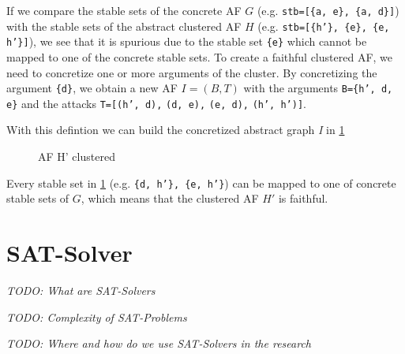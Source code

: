 If we compare the stable sets of the concrete AF $G$ (e.g. \texttt{stb=[\{a, e\}, \{a, d\}]}) with the stable sets of the abstract clustered AF $H$ (e.g. \texttt{stb=[\{h'\}, \{e\}, \{e, h'\}]}), we see that it is spurious due to the stable set \texttt{\{e\}} which cannot be mapped to one of the concrete stable sets. To create a faithful clustered AF, we need to concretize one or more arguments of the cluster. By concretizing the argument \texttt{\{d\}}, we obtain a new AF $I=(B, T)$ with the arguments \texttt{B=\{h', d, e\}} and the attacks \texttt{T=[(h', d),}
\texttt{(d, e),}
\texttt{(e, d),}
\texttt{(h', h')]}. 

With this defintion we can build the concretized abstract graph \textit{I} in \ref{af:backgroundClusterExample3}


\begin{figure}[h]
    \centering
    \caption{\ac{AF} H' clustered}
    \label{af:backgroundClusterExample3}
\end{figure}

Every stable set in \ref{af:backgroundClusterExample3} (e.g. \texttt{\{d, h'\}, \{e, h'\}}) can be mapped to one of concrete stable sets of $G$, which means that the clustered AF $H'$ is faithful.






\section{SAT-Solver}

\textit{TODO: What are SAT-Solvers}

\textit{TODO: Complexity of SAT-Problems}

\textit{TODO: Where and how do we use SAT-Solvers in the research}

